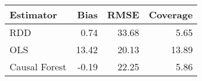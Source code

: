 \begin{table}[ht]
\centering
\begin{tabular}{lrrr}
  \hline
Estimator & Bias & RMSE & Coverage \\ 
  \hline
RDD & 0.74 & 33.68 & 5.65 \\ 
  OLS & 13.42 & 20.13 & 13.89 \\ 
  Causal Forest & -0.19 & 22.25 & 5.86 \\ 
   \hline
\end{tabular}
\end{table}
